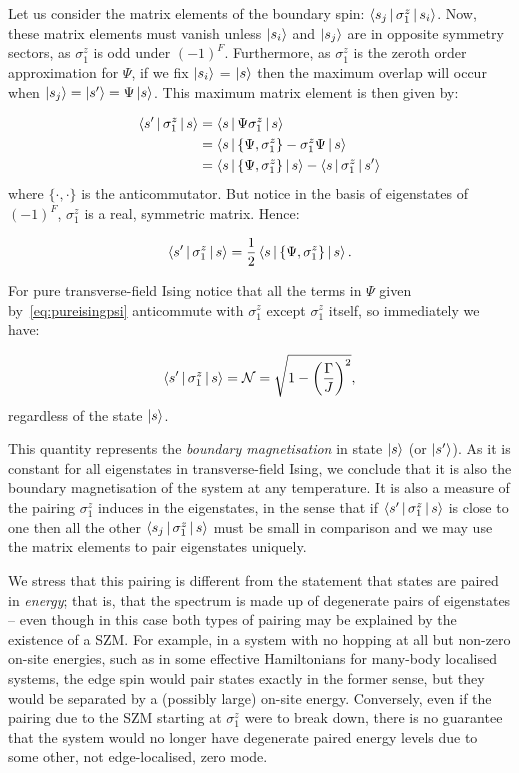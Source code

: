\documentclass [a4paper, 11pt]{article}
\begin{document}
Let us consider the matrix elements of the boundary spin: $\Braket{s_j|\sigma_1^z|s_i}$. Now, these matrix elements must vanish unless $\ket{s_i}$ and $\ket{s_j}$ are in opposite symmetry sectors, as  $\sigma^z_1$ is odd under $(-1)^F$. Furthermore, as $\sigma^z_1$ is the zeroth order approximation for $\Psi$, if we fix $\ket{s_i}$ =  $\ket{s}$ then the maximum overlap will occur when $\ket{s_j} = \ket{s^\prime} = \Psi \ket{s}$. This maximum matrix element is then given by:

\begin{align*}
 \Braket{s^\prime|\sigma_1^z|s}  &= \Braket{s| \Psi \sigma_1^z | s} \\
                                &= \Braket{s| \{\Psi, \sigma_1^z\} - \sigma_1^z \Psi | s} \\
                                 &=  \Braket{s| \{\Psi, \sigma_1^z\}| s} - \Braket{s|\sigma_1^z| s^\prime}
\end{align*}
where $\{\cdot,\cdot\}$ is the anticommutator. But notice in the basis of eigenstates of $(-1)^F$, $\sigma_1^z$ is a real, symmetric matrix. Hence:

\begin{equation}
\label{eq:anticommpsi}
\Braket{s^\prime|\sigma_1^z|s} = \frac{1}{2}  \Braket{s| \{\Psi, \sigma_1^z\}| s}.
\end{equation}

For pure transverse-field Ising notice that all the terms in $\Psi$ given by~\eqref{eq:pureisingpsi} anticommute with $\sigma^z_1$ except $\sigma^z_1$ itself, so immediately we have:

\begin{equation}
\label{eq:isingbm}
\Braket{s^\prime|\sigma_1^z|s} = \mathcal{N} =  \sqrt{1-\left(\frac{\Gamma}{J}\right)^2},
\end{equation}
regardless of the state $\ket{s}$.

This quantity represents the \emph{boundary magnetisation} in state $\ket{s}$ (or  $\ket{s^\prime}$). As it is constant for all eigenstates in transverse-field Ising, we conclude that it is also the boundary magnetisation of the system at any temperature. It is also a measure of the pairing $\sigma^z_1$ induces in the eigenstates, in the sense that if $\Braket{s^\prime|\sigma_1^z|s}$ is close to one then all the other $\Braket{s_j|\sigma_1^z|s}$ must be small in comparison and we may use the matrix elements to pair eigenstates uniquely. 

We stress that this pairing is different from the statement that states are paired in \emph{energy}; that is, that the spectrum is made up of degenerate pairs of eigenstates -- even though in this case both types of pairing may be explained by the existence of a SZM. For example, in a system with no hopping at all but non-zero on-site energies, such as in some effective Hamiltonians for many-body localised systems, the edge spin would pair states exactly in the former sense, but they would be separated by a (possibly large) on-site energy. Conversely, even if the pairing due to the SZM starting at $\sigma^z_1$ were to break down, there is no guarantee that the system would no longer have degenerate paired energy levels due to some other, not edge-localised, zero mode.
\end{document}
